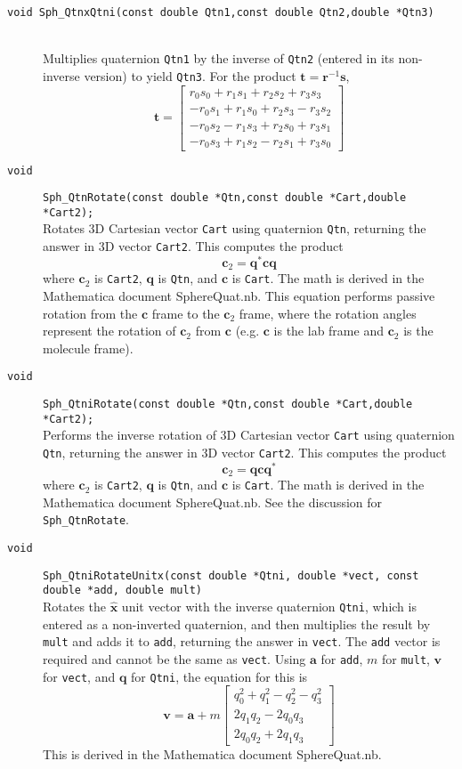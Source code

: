 \documentclass[11pt]{article}
\newcommand {\ttt} {\texttt}
\begin{document}
\begin{description}
\item[\ttt{void Sph\_QtnxQtni(const double Qtn1,const double Qtn2,double *Qtn3)}]
\hfill \\
Multiplies quaternion \ttt{Qtn1} by the inverse of \ttt{Qtn2} (entered in its non-inverse version) to yield \ttt{Qtn3}. For the product $\bm{t}=\bm{r}^{-1}\bm{s}$,
$$\bm{t}=\left[\begin{array}{c}
r_0s_0 + r_1s_1 + r_2s_2 + r_3s_3 \\
-r_0s_1 + r_1s_0 + r_2s_3 - r_3s_2 \\
-r_0s_2 - r_1s_3 + r_2s_0 + r_3s_1 \\
-r_0s_3 + r_1s_2 - r_2s_1 + r_3s_0
\end{array} \right]$$


\item[\ttt{void}]
\ttt{Sph\_QtnRotate(const double *Qtn,const double *Cart,double *Cart2);}
\hfill \\
Rotates 3D Cartesian vector \ttt{Cart} using quaternion \ttt{Qtn}, returning the answer in 3D vector \ttt{Cart2}. This computes the product
$$\bm{c}_2 = \bm{q}^* \bm{c} \bm{q}$$
where $\bm{c}_2$ is \ttt{Cart2}, $\bm{q}$ is \ttt{Qtn}, and $\bm{c}$ is \ttt{Cart}. The math is derived in the Mathematica document SphereQuat.nb. This equation performs passive rotation from the $\bm{c}$ frame to the $\bm{c}_2$ frame, where the rotation angles represent the rotation of $\bm{c}_2$ from $\bm{c}$ (e.g. $\bm{c}$ is the lab frame and $\bm{c}_2$ is the molecule frame).


\item[\ttt{void}]
\ttt{Sph\_QtniRotate(const double *Qtn,const double *Cart,double *Cart2);}
\hfill \\
Performs the inverse rotation of 3D Cartesian vector \ttt{Cart} using quaternion \ttt{Qtn}, returning the answer in 3D vector \ttt{Cart2}. This computes the product
$$\bm{c}_2 = \bm{q} \bm{c} \bm{q}^*$$
where $\bm{c}_2$ is \ttt{Cart2}, $\bm{q}$ is \ttt{Qtn}, and $\bm{c}$ is \ttt{Cart}. The math is derived in the Mathematica document SphereQuat.nb. See the discussion for \ttt{Sph\_QtnRotate}.


\item[\ttt{void}]
\ttt{Sph\_QtniRotateUnitx(const double *Qtni, double *vect, const double *add, double mult)}
\hfill \\
Rotates the $\hat{\bm{x}}$ unit vector with the inverse quaternion \ttt{Qtni}, which is entered as a non-inverted quaternion, and then multiplies the result by \ttt{mult} and adds it to \ttt{add}, returning the answer in \ttt{vect}. The \ttt{add} vector is required and cannot be the same as \ttt{vect}. Using $\bm{a}$ for \ttt{add}, $m$ for \ttt{mult}, $\bm{v}$ for \ttt{vect}, and $\bm{q}$ for \ttt{Qtni}, the equation for this is
$$\bm{v} = \bm{a} + m \left[ \begin{array}{c}
q_0^2 + q_1^2 - q_2^2 - q_3^2 \\
2 q_1 q_2 - 2 q_0 q_3 \\
2 q_0 q_2 + 2 q_1 q_3
\end{array} \right]$$
This is derived in the Mathematica document SphereQuat.nb.



\end{description}
\end{document}
